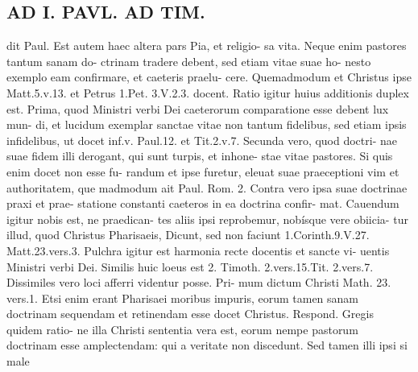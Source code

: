 \documentclass{article}
\begin{document}
\begin{pages}
\section*{AD I. PAVL. AD TIM. }
\marginpar{[ p.204 ]}dit Paul. Est autem haec altera pars Pia, et religio- sa vita. Neque enim pastores tantum sanam do- ctrinam tradere debent, sed etiam vitae suae ho- nesto exemplo eam confirmare, et caeteris praelu- cere. Quemadmodum et Christus ipse Matt.5.v.13. et Petrus 1.Pet. 3.V.2.3. docent. Ratio igitur huius additionis duplex est. Prima, quod Ministri verbi Dei caeterorum comparatione esse debent lux mun- di, et lucidum exemplar sanctae vitae non tantum fidelibus, sed etiam ipsis infidelibus, ut docet inf.v. Paul.12. et Tit.2.v.7. Secunda vero, quod doctri- nae suae fidem illi derogant, qui sunt turpis, et inhone- stae vitae pastores. Si quis enim docet non esse fu- randum et ipse furetur, eleuat suae praeceptioni vim et authoritatem, que madmodum ait Paul. Rom. 2. Contra vero ipsa suae doctrinae praxi et prae- statione constanti caeteros in ea doctrina confir- mat. Cauendum igitur nobis est, ne praedican- tes aliis ipsi reprobemur, nobísque vere obiicia- tur illud, quod Christus Pharisaeis, Dicunt, sed non faciunt 1.Corinth.9.V.27. Matt.23.vers.3. Pulchra igitur est harmonia recte docentis et sancte vi- uentis Ministri verbi Dei. Similis huic loeus est 2. Timoth. 2.vers.15.Tit. 2.vers.7. Dissimiles vero loci afferri videntur posse. Pri- mum dictum Christi Math. 23. vers.1. Etsi enim erant Pharisaei moribus impuris, eorum tamen sanam doctrinam sequendam et retinendam esse docet Christus. Respond. Gregis quidem ratio- ne illa Christi sententia vera est, eorum nempe pastorum doctrinam esse amplectendam: qui a veritate non discedunt. Sed tamen illi ipsi si male 

\end{pages}
\end{document}
